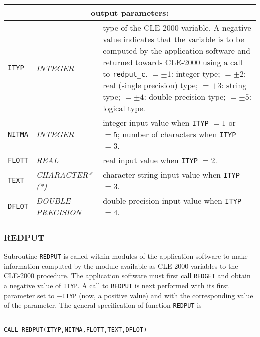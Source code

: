 \vskip 0.8cm

\noindent
\begin{tabular}{|p{1.5cm}|p{3cm}|p{10cm}|}
\hline
\multicolumn{3}{|c|}{\bf output parameters:} \\
\hline
{\tt ITYP} & {\it INTEGER} & type of the CLE-2000 variable. A negative value indicates that the variable is to be computed by the application software and returned towards CLE-2000 using a call to {\tt redput\_c}. $=\pm 1$: integer type;
$=\pm 2$: real (single precision) type;
$=\pm 3$: string type;
$=\pm 4$: double precision type;
$=\pm 5$: logical type.\\
\hline
{\tt NITMA} & {\it INTEGER} & integer input value when {\tt ITYP} $= 1$ or $= 5$;  number of characters when {\tt ITYP} $= 3$. \\
\hline
{\tt FLOTT} & {\it REAL} &  real input value when {\tt ITYP} $= 2$.  \\
\hline
{\tt TEXT} & {\it CHARACTER*(*)} & character string input value when {\tt ITYP} $= 3$.   \\
\hline
{\tt DFLOT} & {\it DOUBLE PRECISION} & double precision input value when {\tt ITYP} $= 4$.   \\
\hline
\end{tabular}

\subsubsection{REDPUT}

Subroutine {\tt REDPUT} is called within modules of the application software to make information computed by the module available as CLE-2000 variables to the CLE-2000 procedure.
The application software must first call {\tt REDGET} and obtain a negative value of {\tt ITYP}. A call to {\tt REDPUT} is next performed with its first parameter set to
$-${\tt ITYP} (now, a positive value) and with the corresponding value of the parameter.
The general specification of function {\tt REDPUT} is

\begin{verbatim}

CALL REDPUT(ITYP,NITMA,FLOTT,TEXT,DFLOT)
\end{verbatim}

\vskip 0.8cm

